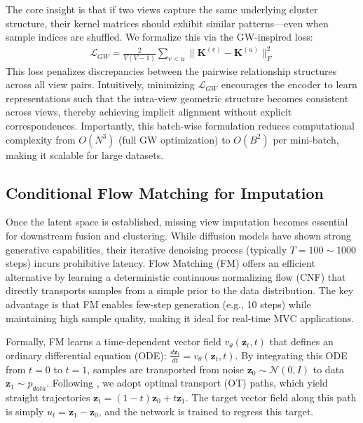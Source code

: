 \documentclass{article}
\theoremstyle{plain}
\theoremstyle{definition}
\theoremstyle{remark}
\begin{document}
The core insight is that if two views capture the same underlying cluster structure, their kernel matrices should exhibit similar patterns---even when sample indices are shuffled. We formalize this via the GW-inspired loss:
\begin{align}
\mathcal{L}_{GW} = \frac{2}{V(V-1)} \sum_{v < u} \| \mathbf{K}^{(v)} - \mathbf{K}^{(u)} \|_F^2
\end{align}
This loss penalizes discrepancies between the pairwise relationship structures across all view pairs. Intuitively, minimizing $\mathcal{L}_{GW}$ encourages the encoder to learn representations such that the intra-view geometric structure becomes consistent across views, thereby achieving implicit alignment without explicit correspondences. Importantly, this batch-wise formulation reduces computational complexity from $O(N^3)$ (full GW optimization) to $O(B^2)$ per mini-batch, making it scalable for large datasets.

\subsection{Conditional Flow Matching for Imputation}\label{conditional-flow}
Once the latent space is established, missing view imputation becomes essential for downstream fusion and clustering. While diffusion models have shown strong generative capabilities, their iterative denoising process (typically $T=100\sim1000$ steps) incurs prohibitive latency. Flow Matching (FM) \cite{lipmanFlowMatchingGenerative2023a} offers an efficient alternative by learning a deterministic continuous normalizing flow (CNF) that directly transports samples from a simple prior to the data distribution. The key advantage is that FM enables few-step generation (e.g., 10 steps) while maintaining high sample quality, making it ideal for real-time MVC applications.

Formally, FM learns a time-dependent vector field $v_\theta(\mathbf{z}_t, t)$ that defines an ordinary differential equation (ODE): $\frac{d\mathbf{z}_t}{dt} = v_\theta(\mathbf{z}_t, t)$. By integrating this ODE from $t=0$ to $t=1$, samples are transported from noise $\mathbf{z}_0 \sim \mathcal{N}(0, I)$ to data $\mathbf{z}_1 \sim p_{data}$. Following \cite{lipmanFlowMatchingGenerative2023a}, we adopt optimal transport (OT) paths, which yield straight trajectories $\mathbf{z}_t = (1-t)\mathbf{z}_0 + t\mathbf{z}_1$. The target vector field along this path is simply $u_t = \mathbf{z}_1 - \mathbf{z}_0$, and the network is trained to regress this target.
\end{document}
